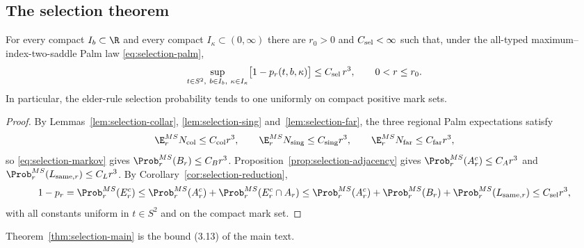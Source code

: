 \subsection{The selection theorem}\label{ssec:selection-theorem}

\begin{theorem}\label{thm:selection-main}
For every compact $I_b\subset\R$ and every compact $I_\kappa\subset(0,\infty)$ there are $r_0>0$ and $C_{\rm sel}<\infty$ such that, under the all-typed maximum--index-two-saddle Palm law \eqref{eq:selection-palm},
\begin{equation}\label{eq:selection-main}
\sup_{t\in S^2,\ b\in I_b,\ \kappa\in I_\kappa}\bigl[1-p_r(t,b,\kappa)\bigr]\le C_{\rm sel}\,r^3,\qquad0<r\le r_0 .
\end{equation}
In particular, the elder-rule selection probability tends to one uniformly on compact positive mark sets.
\end{theorem}

\begin{proof}
By Lemmas~\ref{lem:selection-collar}, \ref{lem:selection-sing} and~\ref{lem:selection-far}, the three regional Palm expectations satisfy
\begin{equation}\label{eq:selection-regional}
\E^{MS}_rN_{\rm col}\le C_{\rm col}r^3,\qquad\E^{MS}_rN_{\rm sing}\le C_{\rm sing}r^3,\qquad\E^{MS}_rN_{\rm far}\le C_{\rm far}r^3,
\end{equation}
so \eqref{eq:selection-markov} gives $\Prob^{MS}_r(B_r)\le C_Br^3$. Proposition~\ref{prop:selection-adjacency} gives $\Prob^{MS}_r(A_r^c)\le C_Ar^3$ and $\Prob^{MS}_r(L_{{\rm same},r})\le C_Lr^3$. By Corollary~\ref{cor:selection-reduction},
\[
1-p_r=\Prob^{MS}_r(E_r^c)\le\Prob^{MS}_r(A_r^c)+\Prob^{MS}_r(E_r^c\cap A_r)\le\Prob^{MS}_r(A_r^c)+\Prob^{MS}_r(B_r)+\Prob^{MS}_r(L_{{\rm same},r})\le C_{\rm sel}r^3,
\]
with all constants uniform in $t\in S^2$ and on the compact mark set.
\end{proof}

Theorem~\ref{thm:selection-main} is the bound (3.13) of the main text.

